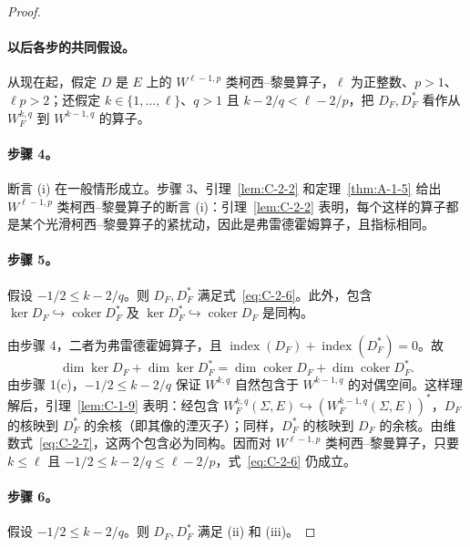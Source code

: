 \begin{proof}
\paragraph{以后各步的共同假设。} 从现在起，假定 $D$ 是 $E$ 上的 $W^{\ell-1,p}$ 类柯西–黎曼算子，$\ell$ 为正整数、$p>1$、$\ell p>2$；还假定 $k\in\{1,\ldots,\ell\}$、$q>1$ 且 $k-2/q<\ell-2/p$，把 $D_F,D_F^*$ 看作从 $W_F^{k,q}$ 到 $W^{k-1,q}$ 的算子。

\paragraph{步骤 4。} 断言 (i) 在一般情形成立。步骤 3、引理~\ref{lem:C-2-2} 和定理~\ref{thm:A-1-5} 给出 $W^{\ell-1,p}$ 类柯西–黎曼算子的断言 (i)：引理~\ref{lem:C-2-2} 表明，每个这样的算子都是某个光滑柯西–黎曼算子的紧扰动，因此是弗雷德霍姆算子，且指标相同。

\paragraph{步骤 5。} 假设 $-1/2\le k-2/q$。则 $D_F,D_F^*$ 满足式~\eqref{eq:C-2-6}。此外，包含 $\ker D_F\hookrightarrow\operatorname{coker}D_F^*$ 及 $\ker D_F^*\hookrightarrow\operatorname{coker}D_F$ 是同构。

由步骤 4，二者为弗雷德霍姆算子，且 $\operatorname{index}(D_F)+\operatorname{index}(D_F^*)=0$。故
\begin{equation}\label{eq:C-2-7}
  \dim\ker D_F+\dim\ker D_F^*
  =\dim\operatorname{coker}D_F+\dim\operatorname{coker}D_F^*.
\end{equation}
由步骤 1(c)，$-1/2\le k-2/q$ 保证 $W^{k,q}$ 自然包含于 $W^{k-1,q}$ 的对偶空间。这样理解后，引理~\ref{lem:C-1-9} 表明：经包含 $W_F^{k,q}(\Sigma,E)\hookrightarrow(W_F^{k-1,q}(\Sigma,E))^*$，$D_F$ 的核映到 $D_F^*$ 的余核（即其像的湮灭子）；同样，$D_F^*$ 的核映到 $D_F$ 的余核。由维数式~\eqref{eq:C-2-7}，这两个包含必为同构。因而对 $W^{\ell-1,p}$ 类柯西–黎曼算子，只要 $k\le\ell$ 且 $-1/2\le k-2/q\le\ell-2/p$，式~\eqref{eq:C-2-6} 仍成立。

\paragraph{步骤 6。} 假设 $-1/2\le k-2/q$。则 $D_F,D_F^*$ 满足 (ii) 和 (iii)。


\end{proof}
